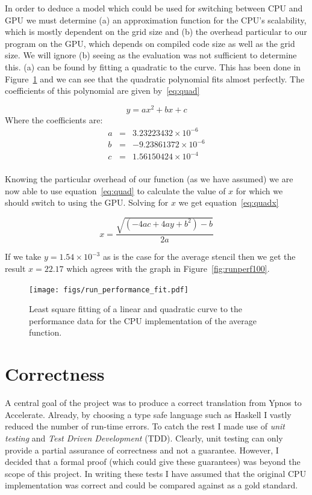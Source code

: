 \documentclass[12pt,a4paper,twoside]{scrbook}
\begin{document}
In order to deduce a model which could be used for switching between CPU and GPU
we must determine (a) an approximation function for the CPU's scalability, which
is mostly dependent on the grid size and (b) the overhead particular to our
program on the GPU, which depends on compiled code size as well as the grid
size. We will ignore (b) seeing as the evaluation was not sufficient to
determine this. (a) can be found by fitting a quadratic to the curve. This has
been done in Figure~\ref{fig:fitting} and we can see that the quadratic
polynomial fits almost perfectly. The coefficients of this polynomial are given
by~\ref{eq:quad}

\begin{equation} \label{eq:quad}
y = a x^2 + b x + c
\end{equation}
Where the coefficients are:
\begin{align*}
a & = & 3.23223432 \times 10^{-6}\\
b & = & -9.23861372 \times 10^{-6}\\
c & = & 1.56150424 \times 10^{-4}\\
\end{align*}

Knowing the particular overhead of our function (as we have assumed) we are now
able to use equation~\ref{eq:quad} to calculate the value of $x$ for which we
should switch to using the GPU. Solving for $x$ we get equation~\ref{eq:quadx}

\begin{equation} \label{eq:quadx}
x = \frac{\sqrt{(-4 a c+4 a y+b^2)-b}}{2 a}
\end{equation}

If we take $y=1.54 \times 10^{-3}$ as is the case for the average stencil then
we get the result $x=22.17$ which agrees with the graph in
Figure~\ref{fig:runperf100}.

\begin{figure}[h]
  \texttt{[image: figs/run\_performance\_fit.pdf]}
  \caption{Least square fitting of a linear and quadratic curve to the
    performance data for the CPU implementation of the average function.}
  \label{fig:fitting}
\end{figure}

\section{Correctness}

A central goal of the project was to produce a correct translation from Ypnos to
Accelerate. Already, by choosing a type safe language such as Haskell I vastly
reduced the number of run-time errors. To catch the rest I made use of
\emph{unit testing} and \emph{Test Driven Development} (TDD). Clearly, unit testing can only provide a
partial assurance of correctness and not a guarantee. However, I decided that a
formal proof (which could give these guarantees) was beyond the scope of this
project. In writing these tests I have assumed that the original CPU
implementation was correct and could be compared against as a gold standard.
\end{document}
